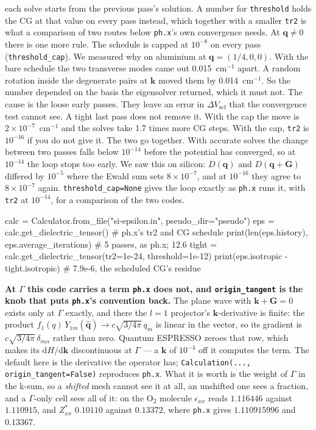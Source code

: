 \documentclass[11pt,a4paper]{article}
\newcommand{\code}[1]{\texttt{\small #1}}
\begin{document}
each solve starts from the previous pass's solution. A number for
\code{threshold} holds the CG at that value on every pass instead, which together
with a smaller \code{tr2} is what a comparison of two routes below \code{ph.x}'s
own convergence needs. At $\mathbf q \neq 0$ there is one more rule. The schedule
is capped at $10^{-8}$ on every pass (\code{threshold\_cap}). We measured why on
aluminium at $\mathbf q = (1/4, 0, 0)$. With the bare schedule the two transverse
modes came out 0.015~cm$^{-1}$ apart. A random rotation inside the degenerate
pairs at $\mathbf k$ moved them by 0.014~cm$^{-1}$. So the number depended on
the basis the eigensolver returned, which it must not. The cause is the loose
early passes. They leave an error in $\Delta V_{\mathrm{scf}}$ that the
convergence test cannot see. A tight last pass does not remove it. With the cap
the move is $2\times10^{-7}$~cm$^{-1}$ and the solves take 1.7 times more CG
steps. With the cap, \code{tr2} is $10^{-16}$ if you do not give it. The two
go together. With accurate solves the change between two passes falls below
$10^{-14}$ before the potential has converged, so at $10^{-14}$ the loop
stops too early. We saw this on silicon: $D(\mathbf q)$ and
$D(\mathbf q + \mathbf G)$ differed by $10^{-5}$ where the Ewald sum sets
$8\times10^{-7}$, and at $10^{-16}$ they agree to $8\times10^{-7}$ again.
\code{threshold\_cap=None} gives the loop exactly as \code{ph.x} runs it, with
\code{tr2} at $10^{-14}$, for a comparison of the two codes.

\begin{pycode}
calc = Calculator.from_file("si-epsilon.in", pseudo_dir="pseudo")
eps = calc.get_dielectric_tensor()          # ph.x's tr2 and CG schedule
print(len(eps.history), eps.average_iterations)   # 5 passes, as ph.x; 12.6
tight = calc.get_dielectric_tensor(tr2=1e-24, threshold=1e-12)
print(eps.isotropic - tight.isotropic)      # 7.9e-6, the scheduled CG's residue
\end{pycode}

\textbf{At $\Gamma$ this code carries a term \code{ph.x} does not, and
\code{origin\_tangent} is the knob that puts \code{ph.x}'s convention back.}
The plane wave with $\mathbf k+\mathbf G=0$ exists only at $\Gamma$ exactly, and
there the $l=1$ projector's $\mathbf k$-derivative is finite: the product
$f_1(q)\,Y_{1m}(\hat{\mathbf q})\to c\sqrt{3/4\pi}\,q_m$ is linear in the
vector, so its gradient is $c\sqrt{3/4\pi}\,\delta_{m\alpha}$ rather than zero.
Quantum ESPRESSO zeroes that row, which makes its $\mathrm{d}H/\mathrm{d}\mathbf k$
discontinuous at $\Gamma$ --- a $\mathbf k$ of $10^{-4}$ off it computes the
term. The default here is the derivative the operator has;
\code{Calculation(..., origin\_tangent=False)} reproduces \code{ph.x}. What it
is worth is the weight of $\Gamma$ in the k-sum, so a \emph{shifted} mesh cannot
see it at all, an unshifted one sees a fraction, and a $\Gamma$-only cell sees
all of it: on the O$_2$ molecule $\epsilon_{xx}$ reads $1.116446$ against
$1.110915$, and $Z^{\ast}_{xx}$ $0.10110$ against $0.13372$, where \code{ph.x}
gives $1.110915996$ and $0.13367$.
\end{document}

